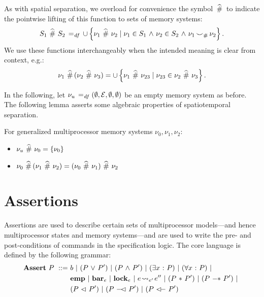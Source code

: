 \documentclass[11pt]{report}
\begin{document}
As with spatial separation, we overload for convenience the symbol $\operatorname{\,\widehat{\#}\,}$ to indicate the pointwise lifting of this function to sets of memory systems: \[ S_1 \operatorname{\,\widehat{\#}\,} S_2 \operatorname{\;=_{\mathit{df}}\;} \cup \left\lbrace \nu_1 \operatorname{\,\widehat{\#}\,} \nu_2 \mid \nu_1 \in S_1 \operatorname{\,\wedge\,} \nu_2 \in S_2 \operatorname{\,\wedge\,} \nu_1 \operatorname{\smile}_\# \nu_2 \right\rbrace.\] We use these functions interchangeably when the intended meaning is clear from context, e.g.: \[ \nu_1 \operatorname{\,\widehat{\#}\,} (\nu_2 \operatorname{\,\widehat{\#}\,} \nu_3) = \cup \left\lbrace \nu_1 \operatorname{\,\widehat{\#}\,} \nu_{23} \mid \nu_{23} \in \nu_2 \operatorname{\,\widehat{\#}\,} \nu_3 \right\rbrace.\] 

In the following, let $\nu_u \operatorname{\;=_{\mathit{df}}\;} (\operatorname{\emptyset}, \mathcal{E}, \operatorname{\emptyset}, \operatorname{\emptyset})$ be an empty memory system as before. The following lemma asserts some algebraic properties of spatiotemporal separation. \begin{lemma}
  \label{lem:spatiotemporal-separation-algebra}
  For generalized multiprocessor memory systems $\nu_0, \nu_1, \nu_2$: 
  \begin{itemize}
    \item $\nu_u \operatorname{\,\widehat{\#}\,} \nu_0 = \left\lbrace \nu_0 \right\rbrace$
    \item $\nu_0 \operatorname{\,\widehat{\#}\,} (\nu_1 \operatorname{\,\widehat{\#}\,} \nu_2) = (\nu_0 \operatorname{\,\widehat{\#}\,} \nu_1) \operatorname{\,\widehat{\#}\,} \nu_2$
  \end{itemize}
\end{lemma}

\section{Assertions}
\label{sec:assertions}
\label{sec:multiprocessor-assertions}

Assertions are used to describe certain sets of multiprocessor models---and hence multiprocessor states and memory systems---and are used to write the pre- and post-conditions of commands in the specification logic. The core language is defined by the following grammar: \begin{align*}
	\asserts~P \bnfdef & b \bnfbar (P \disj P') \bnfbar (P \conj P') \bnfbar (\exists x \st P) \bnfbar (\forall x \st P) \bnfbar \\
	& \femp \bnfbar \fbar{e} \bnfbar \flock{e} \bnfbar e \fwrite{e'} e'' \bnfbar (P \fsep P') \bnfbar (P \fsepi P')  \bnfbar \\ 
	&  (P \fseq P') \bnfbar (P \fseqli P') \bnfbar (P \fseqri P')
\end{align*} 
\end{document}
